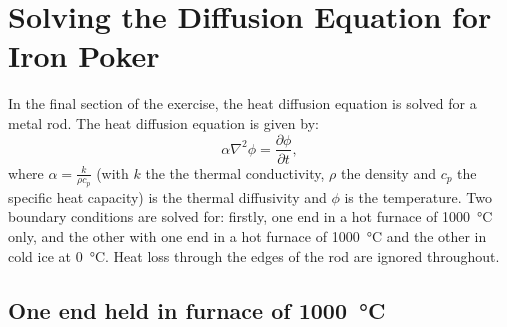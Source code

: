 \section{Solving the Diffusion Equation for Iron Poker}
\label{sec:diffusion_equation}

In the final section of the exercise, the heat diffusion equation is solved for a metal rod. The heat diffusion equation is given by:
\begin{equation}
    \alpha \nabla^2 \phi = \frac{\partial \phi}{\partial t},
\end{equation}
where $\alpha = \frac{k}{\rho c_p}$ (with $k$ the the thermal conductivity, $\rho$ the density and $c_p$ the specific heat capacity) is the thermal diffusivity and $\phi$ is the temperature. Two boundary conditions are solved for: firstly, one end in a hot furnace of \SI{1000}{\celsius} only, and the other with one end in a hot furnace of \SI{1000}{\celsius} and the other in cold ice at \SI{0}{\celsius}. Heat loss through the edges of the rod are ignored throughout.

\subsection{One end held in furnace of \SI{1000}{\celsius}}

